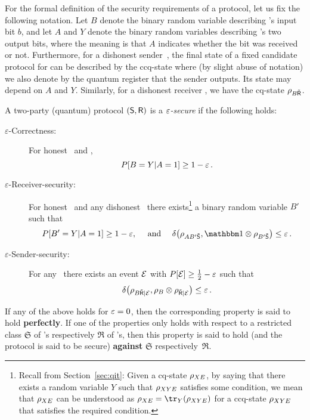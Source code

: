 
For the formal definition of the security requirements of a \RabinOT
protocol, let us fix the following notation. Let $B$ denote the binary
random variable describing \A's input bit $b$, and let $A$ and $Y$
denote the binary random variables describing \B's two output bits,
where the meaning is that $A$ indicates whether the bit was received
or not. 
Furthermore, for a dishonest sender~\dA, the final state of a fixed
candidate protocol for \RandOT can be described by the ccq-state
 where (by slight abuse of notation) we also denote by
\smash{$\dA$} the quantum register that the sender outputs. Its state may
depend on $A$ and $Y$. Similarly, for a dishonest receiver \dB, we
have the cq-state $\rho_{B \tilde{\sf R}}$.


\begin{definition}\label{def:ROT}
  A two-party (quantum) protocol $({\sf S},{\sf R})$ is a \emph{$\varepsilon$-secure \RabinOT} if the following holds:
\begin{description}
\item[\boldmath$\varepsilon$-Correctness:] For honest \A\ and \B, 
$$P[B=Y|A=1] \geq 1 - \varepsilon \, .$$
\item[\boldmath$\varepsilon$-Receiver-security:] For honest \B\ and any dishonest \dA\ there
  exists\footnote{Recall from Section~\ref{sec:qit}: Given a cq-state
    $\rho_{X E}$, by saying that there exists a random
    variable $Y$ such that $\rho_{XYE}$ satisfies some condition,
    we mean that $\rho_{X E}$ can be understood as $\rho_{X\regE}
    = \tr_Y(\rho_{XY\regE})$ for a ccq-state $\rho_{XYE}$ that
    satisfies the required condition.} a binary random variable $B'$
  such that
\[ \P[B'=Y|A=1] \geq 1 - \eps, \quad\mbox{ and }\quad \dist{\rho_{AB'\dA}, \I \otimes \rho_{B'\dA} } \leq \eps \, . \]
\item[\boldmath$\varepsilon$-Sender-security:] For any \dB\ there exists an event $\mathcal{E}$ with
  $P[\mathcal{E}] \geq \frac{1}{2} - \varepsilon$ such that
\[
\delta\big( \rho_{B\tilde{\sf R}|\mathcal{E}}, \rho_B \otimes \rho_{\tilde{\sf R}|\mathcal{E}} \big) \leq \varepsilon \, .
\]
\end{description}
If any of the above holds for $\varepsilon=0$,  %
then the corresponding property is said to hold {\bf perfectly}. 
If one of the properties only holds with respect to a restricted class
$\mathfrak{S}$ of \dA's respectively $\mathfrak{R}$ of \dB's, then this property
is said to hold (and the protocol is said to be secure) {\bf against}
$\mathfrak{S}$ respectively~$\mathfrak{R}$.
\end{definition}

